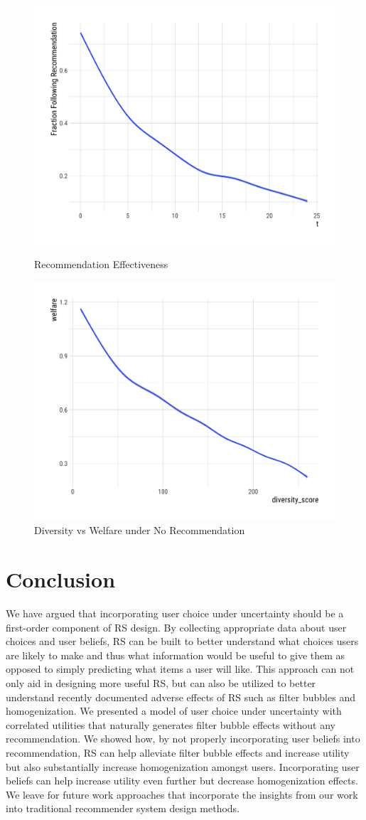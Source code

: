 \documentclass[sigconf]{acmart}
\begin{document}
\begin{figure}
   \begin{minipage}{0.48\textwidth}
     \centering
     \includegraphics[width=.5\linewidth]{figures/rec_obedience_25}
     \caption{Recommendation Effectiveness}\label{fig:rec_obey}
   \end{minipage}\hfill
   \begin{minipage}{0.48\textwidth}
     \centering
     \includegraphics[width=.5\linewidth]{"figures/Diversity vs Welfare - No Recommendation"}
     \caption{Diversity vs Welfare under No Recommendation}\label{fig:diversity_welfare_no_rec}
   \end{minipage}
\end{figure}

\section{Conclusion}

We have argued that incorporating user choice under uncertainty should be a first-order component of RS design. By collecting appropriate data about user choices and user beliefs, RS can be built to better understand what choices users are likely to make and thus what information would be useful to give them as opposed to simply predicting what items a user will like. This approach can not only aid in designing more useful RS, but can also be utilized to better understand recently documented adverse effects of RS such as filter bubbles and homogenization. We presented a model of user choice under uncertainty with correlated utilities that naturally generates filter bubble effects without any recommendation. We showed how, by not properly incorporating user beliefs into recommendation, RS can help alleviate filter bubble effects and increase utility but also substantially increase homogenization amongst users. Incorporating user beliefs can help increase utility even further but decrease homogenization effects. We leave for future work approaches that incorporate the insights from our work into traditional recommender system design methods.



\end{document}
